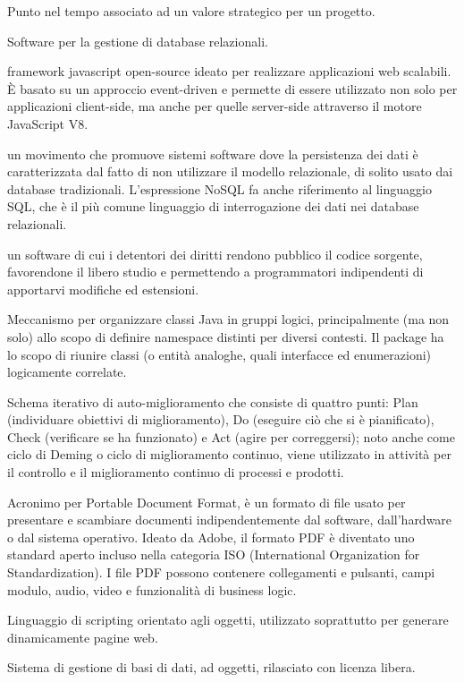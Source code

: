 \item[milestone] Punto nel tempo associato ad un valore strategico per un progetto.
\item[MySQL] Software per la gestione di database relazionali.
\item[Node.js] framework javascript open-source ideato per realizzare applicazioni web scalabili. È basato su un approccio event-driven e permette di essere utilizzato non solo per applicazioni client-side, ma anche per quelle server-side attraverso il motore JavaScript V8.
\item[nosql] un movimento che promuove sistemi software dove la persistenza dei dati è caratterizzata dal fatto di non utilizzare il modello relazionale, di solito usato dai database tradizionali. L'espressione NoSQL fa anche riferimento al linguaggio SQL, che è il più comune linguaggio di interrogazione dei dati nei database relazionali.
\item[Open Source] un software di cui i detentori dei diritti rendono pubblico il codice sorgente, favorendone il libero studio e permettendo a programmatori indipendenti di apportarvi modifiche ed estensioni. 
\item[package] Meccanismo per organizzare classi Java in gruppi logici, principalmente (ma non solo) allo scopo di definire namespace distinti per diversi contesti. Il package ha lo scopo di riunire classi (o entità analoghe, quali interfacce ed enumerazioni) logicamente correlate.
\item[PDCA, schema] Schema iterativo di auto-miglioramento che consiste di quattro punti: Plan (individuare obiettivi di miglioramento), Do (eseguire ciò che si è pianificato), Check (verificare se ha funzionato) e Act (agire per correggersi); noto anche come ciclo di Deming o ciclo di miglioramento continuo, viene utilizzato in attività per il controllo e il miglioramento continuo di processi e prodotti.
\item[PDF] Acronimo per Portable Document Format, è un formato di file usato per presentare e scambiare documenti indipendentemente dal software, dall'hardware o dal sistema operativo. Ideato da Adobe, il formato PDF è diventato uno standard aperto incluso nella categoria ISO (International Organization for Standardization). I file PDF possono contenere collegamenti e pulsanti, campi modulo, audio, video e funzionalità di business logic.
\item[PHP] Linguaggio di scripting orientato agli oggetti, utilizzato soprattutto per generare dinamicamente pagine web.
\item[PostgreSQL] Sistema di gestione di basi di dati, ad oggetti, rilasciato con licenza libera.

